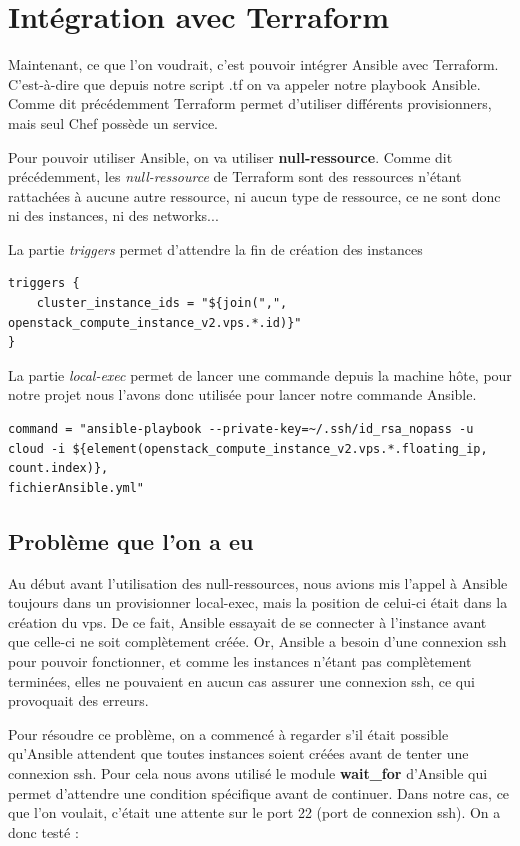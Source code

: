 \documentclass[]{article}
\begin{document}
\section{Intégration avec Terraform}\label{intuxe9gration-avec-terraform}

Maintenant, ce que l'on voudrait, c'est pouvoir intégrer Ansible avec Terraform.
C'est-à-dire que depuis notre script .tf on va appeler notre playbook Ansible. 
Comme dit précédemment Terraform permet d'utiliser différents provisionners, mais seul Chef possède un service. 

Pour pouvoir utiliser Ansible, on va utiliser \textbf{null-ressource}.
Comme dit précédemment, les \textit{null-ressource} de Terraform sont des ressources n'étant rattachées à aucune autre ressource, ni aucun type de ressource, ce ne sont donc ni des instances, ni des networks...

La partie \textit{triggers} permet d'attendre la fin de création des instances
\begin{verbatim}
triggers { 
    cluster_instance_ids = "${join(",", openstack_compute_instance_v2.vps.*.id)}"
}
\end{verbatim}

La partie \textit{local-exec} permet de lancer une commande depuis la machine hôte, pour notre projet nous l'avons donc utilisée pour lancer notre commande Ansible.
\begin{verbatim}
command = "ansible-playbook --private-key=~/.ssh/id_rsa_nopass -u 
cloud -i ${element(openstack_compute_instance_v2.vps.*.floating_ip, count.index)},
fichierAnsible.yml"
\end{verbatim}


\subsection{Problème que l'on a eu}\label{probluxe8me-que-lon-a-eu}

Au début avant l'utilisation des null-ressources, nous avions mis l'appel à Ansible toujours dans un provisionner local-exec, mais la position de celui-ci était dans la création du vps. De ce fait, Ansible essayait de se connecter à l'instance avant que celle-ci ne soit complètement créée. Or, Ansible a besoin
d'une connexion ssh pour pouvoir fonctionner, et comme les instances
n'étant pas complètement terminées, elles ne pouvaient en aucun cas
assurer une connexion ssh, ce qui provoquait des erreurs.

Pour résoudre ce problème, on a commencé à regarder s'il était possible
qu'Ansible attendent que toutes instances soient créées avant de tenter
une connexion ssh. Pour cela nous avons utilisé le module
\textbf{wait\_for} d'Ansible qui permet d'attendre une condition
spécifique avant de continuer. Dans notre cas, ce que l'on voulait,
c'était une attente sur le port 22 (port de connexion ssh). On a donc
testé :
\end{document}
